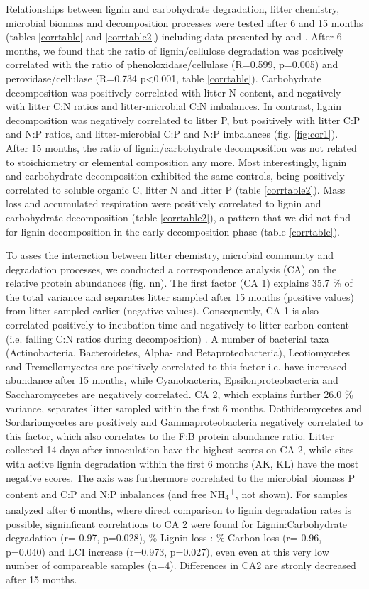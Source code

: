 Relationships between lignin and carbohydrate degradation, litter chemistry, microbial biomass and decomposition processes were tested after 6 and 15 months (tables \ref{corrtable} and \ref{corrtable2}) including data presented by \cite{Mooshammer2011} and \cite{Leitner2011}. After 6 months, we found that the ratio of lignin/cellulose degradation was positively correlated with the ratio of phenoloxidase/cellulase (R=0.599, p=0.005) and peroxidase/cellulase (R=0.734 p\textless 0.001, table \ref{corrtable}). Carbohydrate decomposition was positively correlated with litter N content, and negatively with litter C:N ratios and litter-microbial C:N imbalances. In contrast, lignin decomposition was negatively correlated to litter P, but positively with litter C:P and N:P ratios, and litter-microbial C:P and N:P imbalances (fig. \ref{fig:cor1}). After 15 months, the ratio of lignin/carbohydrate decomposition was not related to stoichiometry or elemental composition any more. Most interestingly, lignin and carbohydrate decomposition exhibited the same controls, being positively correlated to soluble organic C, litter N and litter P (table \ref{corrtable2}). Mass loss and accumulated respiration were positively correlated to lignin and carbohydrate decomposition (table \ref{corrtable2}), a pattern that we did not find for lignin decomposition in the early decomposition phase (table \ref{corrtable}).

To asses the interaction between litter chemistry, microbial community and degradation processes, we conducted a correspondence analysis (CA) on the relative protein abundances (fig. nn). The first factor (CA 1) explains 35.7 \% of the total variance and separates litter sampled after 15 months (positive values) from litter sampled earlier (negative values). Consequently, CA 1 is also correlated positively to incubation time and negatively to litter carbon content (i.e. falling C:N ratios during decomposition) . A number of bacterial taxa (Actinobacteria, Bacteroidetes, Alpha- and Betaproteobacteria), Leotiomycetes and Tremellomycetes are positively correlated to this factor i.e. have increased abundance after 15 months, while Cyanobacteria, Epsilonproteobacteria and Saccharomycetes are negatively correlated. CA 2, which explains further 26.0 \% variance, separates litter sampled within the first 6 months. Dothideomycetes and Sordariomycetes   are positively and Gammaproteobacteria negatively correlated to this factor, which also correlates to the F:B protein abundance ratio. Litter collected 14 days after innoculation have the highest scores on CA 2, while sites with active lignin degradation within the first 6 months (AK, KL) have the most negative scores. The axis was furthermore correlated to the microbial biomass P content and C:P and N:P inbalances (and free NH\textsubscript{4}\textsuperscript{+}, not shown). For samples analyzed after 6 months, where direct comparison to lignin degradation rates is possible, signinficant correlations to CA 2 were found for Lignin:Carbohydrate degradation (r=-0.97, p=0.028), \% Lignin loss : \% Carbon loss (r=-0.96, p=0.040) and  LCI increase (r=0.973, p=0.027), even even at this very low number of compareable samples (n=4). Differences in CA2 are stronly decreased after 15 months.

